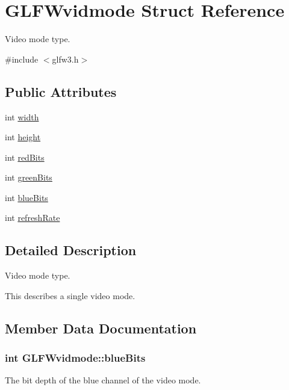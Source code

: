 \hypertarget{structGLFWvidmode}{}\section{G\+L\+F\+Wvidmode Struct Reference}
\label{structGLFWvidmode}


Video mode type.  




{\ttfamily \#include $<$glfw3.\+h$>$}

\subsection*{Public Attributes}
\begin{DoxyCompactItemize}
\item 
int \hyperlink{structGLFWvidmode_a698dcb200562051a7249cb6ae154c71d}{width}
\item 
int \hyperlink{structGLFWvidmode_ac65942a5f6981695517437a9d571d03c}{height}
\item 
int \hyperlink{structGLFWvidmode_a6066c4ecd251098700062d3b735dba1b}{red\+Bits}
\item 
int \hyperlink{structGLFWvidmode_a292fdd281f3485fb3ff102a5bda43faa}{green\+Bits}
\item 
int \hyperlink{structGLFWvidmode_af310977f58d2e3b188175b6e3d314047}{blue\+Bits}
\item 
int \hyperlink{structGLFWvidmode_a791bdd6c7697b09f7e9c97054bf05649}{refresh\+Rate}
\end{DoxyCompactItemize}


\subsection{Detailed Description}
Video mode type. 

This describes a single video mode. 

\subsection{Member Data Documentation}
\hypertarget{structGLFWvidmode_af310977f58d2e3b188175b6e3d314047}{}
\subsubsection[{blue\+Bits}]{\setlength{\rightskip}{0pt plus 5cm}int G\+L\+F\+Wvidmode\+::blue\+Bits}\label{structGLFWvidmode_af310977f58d2e3b188175b6e3d314047}
The bit depth of the blue channel of the video mode. \hypertarget{structGLFWvidmode_a292fdd281f3485fb3ff102a5bda43faa}{}
